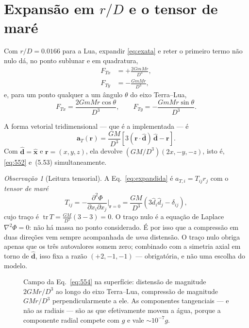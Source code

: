 \documentclass[11pt,a4paper,oneside]{report}
\theoremstyle{definition}
\theoremstyle{plain}
\theoremstyle{remark}
\newtheorem{observacao}[definicao]{Observação}
\newcommand{\vect}[1]{\bm{#1}}
\newcommand{\uvec}[1]{\hat{\bm{#1}}}
\newcommand{\pd}[2]{\frac{\partial #1}{\partial #2}}
\begin{document}
\section{Expansão em $r/D$ e o tensor de maré}

Com $r/D=\num{0.0166}$ para a Lua, expandir \eqref{eq:exata} e reter o primeiro
termo não nulo dá, no ponto sublunar e em quadratura,
\begin{align}
F_{Tx}&=+\frac{2GmM r}{D^{3}}, \tag{T\&M~5.52}\label{eq:552}\\
F_{Ty}&=-\frac{GmM r}{D^{3}}, \tag{T\&M~5.53}
\end{align}
e, para um ponto qualquer a um ângulo $\theta$ do eixo Terra--Lua,
\begin{equation}
F_{Tx}=\frac{2GmMr\cos\theta}{D^{3}},\qquad
F_{Ty}=-\frac{GmMr\sin\theta}{D^{3}} .
\tag{T\&M~5.54a,b}
\label{eq:554}
\end{equation}

A forma vetorial tridimensional — que é a implementada — é
\begin{equation}
\boxed{\;\vect{a}_T(\vect{r})=\frac{GM}{D^{3}}
\left[3(\vect{r}\cdot\uvec{d})\,\uvec{d}-\vect{r}\right].\;}
\label{eq:expandida}
\end{equation}
Com $\uvec{d}=\uvec{x}$ e $\vect{r}=(x,y,z)$, ela devolve
$(GM/D^{3})(2x,-y,-z)$, isto é, \eqref{eq:552} e~(5.53) simultaneamente.

\begin{observacao}[Leitura tensorial]
A Eq.~\eqref{eq:expandida} é $a_{T,i}=T_{ij}r_j$ com o \emph{tensor de maré}
\begin{equation}
T_{ij}=-\pd{^{2}\Phi}{x_i\partial x_j}\bigg|_{\vect{r}=0}
=\frac{GM}{D^{3}}\left(3\hat d_i\hat d_j-\delta_{ij}\right),
\end{equation}
cujo traço é $\;\mathrm{tr}\,T=\frac{GM}{D^{3}}(3-3)=0$. O traço nulo é a
equação de Laplace $\nabla^{2}\Phi=0$: não há massa no ponto considerado. É por
isso que a compressão em duas direções vem sempre acompanhada de \emph{uma}
distensão. O traço nulo obriga apenas que os três autovalores somem zero;
combinado com a simetria axial em torno de $\uvec{d}$, isso fixa a razão
$(+2,-1,-1)$ — obrigatória, e não uma escolha do modelo.
\end{observacao}

\begin{figure}[htbp]
\centering
{}
\caption{Campo da Eq.~\eqref{eq:554} na superfície: distensão de magnitude
$2GMr/D^{3}$ ao longo do eixo Terra--Lua, compressão de magnitude $GMr/D^{3}$
perpendicularmente a ele. As componentes tangenciais — e não as radiais — são
as que efetivamente movem a água, porque a componente radial compete com
$g$ e vale $\sim 10^{-7}g$.}
\label{fig:campo}
\end{figure}
\end{document}
